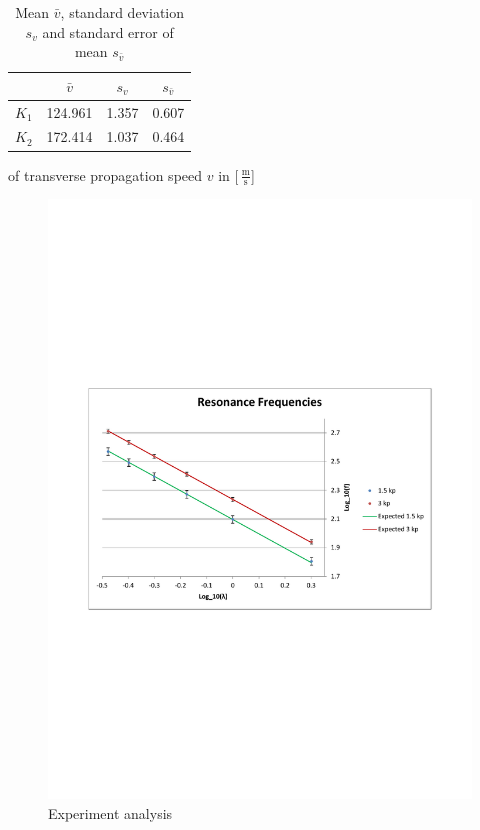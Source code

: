 \documentclass{scrreprt}
\newcommand{\unit}[1]{\ensuremath{\, \mathrm{#1}}}
\begin{document}
\begin{table}[H]
\center
\begin{tabular}{|c|ccc|}
\cline{2-4}
\multicolumn{1}{c|}{}& $\bar{v}$ & $s_{v}$ & $s_{\bar{v}}$\\ \hline
$K_1$ & 124.961 & 1.357 & 0.607 \\ \hline
$K_2$ & 172.414 & 1.037 & 0.464\\ \hline
\end{tabular}
\caption{Mean $\bar{v}$, standard deviation $s_{v}$ and standard error of mean $s_{\bar{v}}$} of transverse propagation speed $v$ in [$\unit{\frac{m}{s}}$]
\end{table}

\begin{figure}[H]
\center
\includegraphics[width=1.0\textwidth]{img/ResonanceFrequencies.pdf}
\caption{Experiment analysis}
\end{figure}
\end{document}
